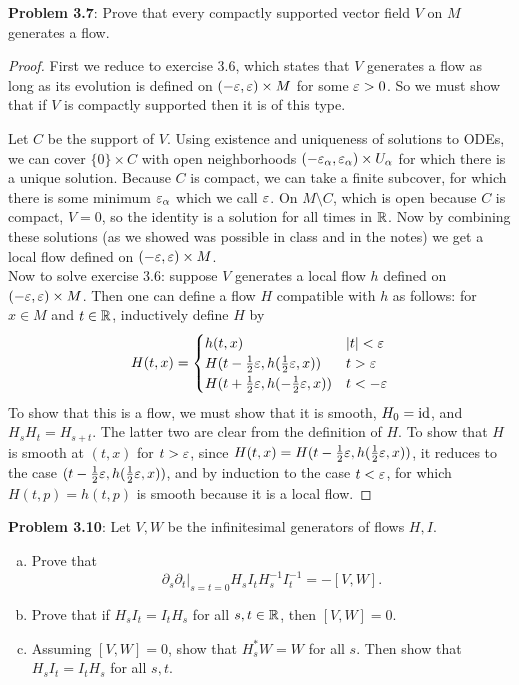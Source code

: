 \documentclass{amsart}
\begin{document}
	\newpage
	
	\textbf{Problem 3.7}: Prove that every compactly supported vector field $V$ on $M$ generates a flow.
	\begin{proof}
		First we reduce to exercise 3.6, which states that $V$ generates a flow as long as its evolution is defined on $(-\varepsilon,\varepsilon)\times M$ for some $\varepsilon>0$. So we must show that if $V$ is compactly supported then it is of this type.
		
		Let $C$ be the support of $V$. Using existence and uniqueness of solutions to ODEs, we can cover $\{0\}\times C$ with open neighborhoods $(-\varepsilon_{\alpha},\varepsilon_{\alpha})\times U_{\alpha}$ for which there is a unique solution. Because $C$ is compact, we can take a finite subcover, for which there is some minimum $\varepsilon_{\alpha}$ which we call $\varepsilon$. On $M\setminus C$, which is open because $C$ is compact, $V=0$, so the identity is a solution for all times in $\mathbb{R}$. Now by combining these solutions (as we showed was possible in class and in the notes) we get a local flow defined on $(-\varepsilon,\varepsilon)\times M$.\\
		
		Now to solve exercise 3.6: suppose $V$ generates a local flow $h$ defined on $(-\varepsilon,\varepsilon)\times M$. Then one can define a flow $H$ compatible with $h$ as follows: for $x\in M$ and $t\in \mathbb{R}$, inductively define $H$ by
		$$H(t,x) = \begin{cases}
			h(t,x) & |t|<\varepsilon \\
			H(t-\tfrac12\varepsilon,h(\tfrac12\varepsilon,x)) & t > \varepsilon\\
			H(t+\tfrac12\varepsilon,h(-\tfrac12\varepsilon,x)) & t < -\varepsilon
		\end{cases}$$
		To show that this is a flow, we must show that it is smooth, $H_0=\operatorname{id}$, and $H_{s}H_t=H_{s+t}$. The latter two are clear from the definition of $H$. To show that $H$ is smooth at $(t,x)$ for $t>\varepsilon$, since $H(t,x)=H(t-\tfrac12\varepsilon,h(\tfrac12\varepsilon,x))$, it reduces to the case $(t-\tfrac12\varepsilon,h(\tfrac12\varepsilon,x))$, and by induction to the case $t<\varepsilon$, for which $H(t,p)=h(t,p)$ is smooth because it is a local flow.
	\end{proof}
	\newpage 
	
	\textbf{Problem 3.10}: Let $V,W$ be the infinitesimal generators of flows $H,I$. 
	\begin{enumerate}[(a)]
		\item Prove that 
		$$
		\partial_s \partial_t\big|_{s=t=0} H_sI_tH_s^{-1}I_t^{-1} = -[V,W].
		$$
		\item Prove that if $H_sI_t=I_tH_s$ for all $s,t\in \mathbb{R}$, then $[V,W]=0$.
		\item Assuming $[V,W]=0$, show that $H_s^*W=W$ for all $s$. Then show that $H_sI_t=I_tH_s$ for all $s,t$.
	\end{enumerate}
	
\end{document}

